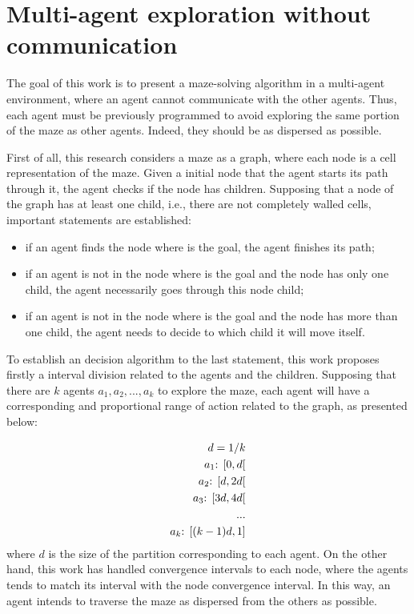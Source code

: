 \section{Multi-agent exploration without communication}
\label{section_models_mixed_radix}
The goal of this work is to present a maze-solving algorithm in a multi-agent environment, where an agent cannot communicate with the other agents. Thus, each agent must be previously programmed to avoid exploring the same portion of the maze as other agents. Indeed, they should be as dispersed as possible.

First of all, this research considers a maze as a graph, where each node is a cell representation of the maze. Given a initial node that the agent starts its path through it, the agent checks if the node has children. Supposing that a node of the graph has at least one child, i.e., there are not completely walled cells, important statements are established:

\begin{itemize}
\item if an agent finds the node where is the goal, the agent finishes its path;

\item if an agent is not in the node where is the goal and the node has only one child, the agent necessarily goes through this node child;

\item if an agent is not in the node where is the goal and the node has more than one child, the agent needs to decide to which child it will move itself.
\end{itemize}

To establish an decision algorithm to the last statement, this work proposes firstly a interval division related to the agents and the children. Supposing that there are $k$ agents $a_{1}, a_{2},...,a_{k}$ to explore the maze, each agent will have a corresponding and proportional range of action related to the graph, as presented below:

\begin{equation}
	\begin{align}
			d = 1/k\\
		a_{1} \textnormal{: } [0, d[\\
		a_{2} \textnormal{: } [d, 2d[\\
		a_{3} \textnormal{: } [3d, 4d[\\
		...\\
		a_{k} \textnormal{: } [(k-1)d, 1]
	\end{align}
\end{equation}
where $d$ is the size of the partition corresponding to each agent. On the other hand, this work has handled convergence intervals to each node, where the agents tends to match its interval with the node convergence interval. In this way, an agent intends to traverse the maze as dispersed from the others as possible.

